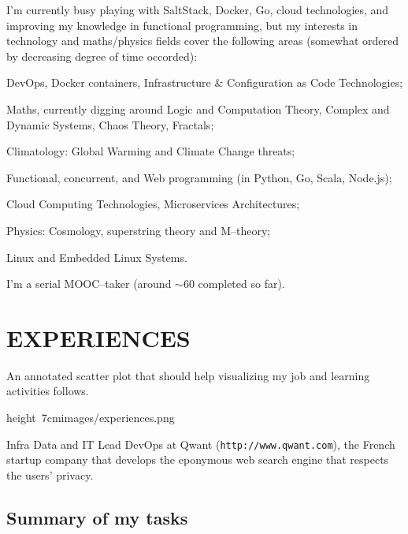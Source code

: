 I'm currently busy playing with SaltStack, Docker, Go,
cloud technologies, and improving my knowledge in functional programming,
but my interests in technology and maths/physics fields cover the following
areas (somewhat ordered by decreasing degree of time occorded):

\bgroup
\item{\bdot}
    DevOps, Docker containers, Infrastructure \& Configuration as Code
    Technologies;
\item{\bdot}
    Maths, currently digging around Logic and Computation Theory,
    Complex and Dynamic Systems, Chaos Theory, Fractals;
\item{\bdot}
    Climatology: Global Warming and Climate Change threats;
\item{\bdot}
    Functional, concurrent, and Web programming
    (in Python, Go, Scala, Node.js);
\item{\bdot}
    Cloud Computing Technologies, Microservices Architectures;
\item{\bdot}
    Physics: Cosmology, superstring theory and \hbox{M--theory};
\item{\bdot}
    Linux and Embedded Linux Systems.
\egroup

\smallskip\nobreak\noindent
I'm a serial MOOC--taker (around $\sim$$60$ completed so far).
\vfill\eject


\section{EXPERIENCES}

An annotated scatter plot that should help visualizing my job and learning activities
follows.

\bigskip
\centerline{%
    \hbox{\pdfximage height 7cm{images/experiences.png}\pdfrefximage\pdflastximage}}
\smallskip



Infra Data and IT Lead DevOps at Qwant ({\tt http://www.qwant.com}), the
French startup company that develops the eponymous web search engine that respects
the users' privacy.

\subsection{Summary of my tasks}

